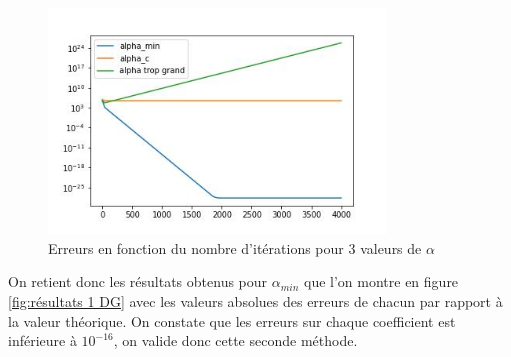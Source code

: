 \documentclass[12pt]{report}
\begin{document}
\begin{figure}
    \centering
    \includegraphics[width=0.8\textwidth]{comparaison_erreurs_selon_alpha_1D.jpg}
    \caption{Erreurs en fonction du nombre d'itérations pour 3 valeurs de $\alpha$}
    \label{fig:erreur selon alpha}
    \end{figure}


On retient donc les résultats obtenus pour $\alpha_{min}$ que l'on montre en figure
 \ref{fig:résultats 1 DG} avec les valeurs absolues des erreurs de chacun par rapport à la valeur théorique. 
On constate que les erreurs sur chaque coefficient
est inférieure à $10^{-16}$, on valide donc cette seconde méthode.
\end{document}
